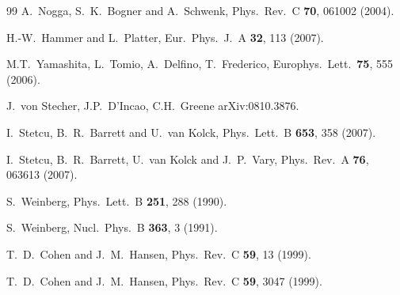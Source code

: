 \documentclass[aps,rmp,nofootinbib,twocolumn,floatfix]{revtex4}
\begin{document}
\begin{thebibliography}{99}
  A.~Nogga, S.~K.~Bogner and A.~Schwenk,
  Phys.\ Rev.\  C {\bf 70}, 061002 (2004).

  H.-W.~Hammer and L.~Platter,
  Eur.\ Phys.\ J.\  A {\bf 32}, 113 (2007).

M.T.~Yamashita, L.~Tomio, A.~Delfino, T.~Frederico,
Europhys.\ Lett.\ {\bf 75}, 555 (2006).

J.~von Stecher, J.P.~D'Incao, C.H.~Greene
arXiv:0810.3876.


  I.~Stetcu, B.~R.~Barrett and U.~van Kolck,
  Phys.\ Lett.\  B {\bf 653}, 358 (2007).

  I.~Stetcu, B.~R.~Barrett, U.~van Kolck and J.~P.~Vary,
  Phys.\ Rev.\  A {\bf 76}, 063613 (2007).


  S.~Weinberg,
  Phys.\ Lett.\  B {\bf 251}, 288 (1990).
 
  S.~Weinberg,
  Nucl.\ Phys.\  B {\bf 363}, 3 (1991).


  T.~D.~Cohen and J.~M.~Hansen,
  Phys.\ Rev.\  C {\bf 59}, 13 (1999).

  T.~D.~Cohen and J.~M.~Hansen,
  Phys.\ Rev.\  C {\bf 59}, 3047 (1999).


\end{thebibliography}
\end{document}
